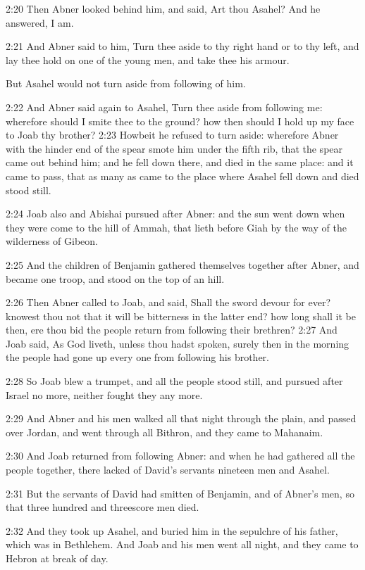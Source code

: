 2:20 Then Abner looked behind him, and said, Art thou Asahel? And he answered, I am.

2:21 And Abner said to him, Turn thee aside to thy right hand or to thy left, and lay thee hold on one of the young men, and take thee his armour.

But Asahel would not turn aside from following of him.

2:22 And Abner said again to Asahel, Turn thee aside from following me: wherefore should I smite thee to the ground? how then should I hold up my face to Joab thy brother?  2:23 Howbeit he refused to turn aside: wherefore Abner with the hinder end of the spear smote him under the fifth rib, that the spear came out behind him; and he fell down there, and died in the same place: and it came to pass, that as many as came to the place where Asahel fell down and died stood still.

2:24 Joab also and Abishai pursued after Abner: and the sun went down when they were come to the hill of Ammah, that lieth before Giah by the way of the wilderness of Gibeon.

2:25 And the children of Benjamin gathered themselves together after Abner, and became one troop, and stood on the top of an hill.

2:26 Then Abner called to Joab, and said, Shall the sword devour for ever?  knowest thou not that it will be bitterness in the latter end?  how long shall it be then, ere thou bid the people return from following their brethren?  2:27 And Joab said, As God liveth, unless thou hadst spoken, surely then in the morning the people had gone up every one from following his brother.

2:28 So Joab blew a trumpet, and all the people stood still, and pursued after Israel no more, neither fought they any more.

2:29 And Abner and his men walked all that night through the plain, and passed over Jordan, and went through all Bithron, and they came to Mahanaim.

2:30 And Joab returned from following Abner: and when he had gathered all the people together, there lacked of David's servants nineteen men and Asahel.

2:31 But the servants of David had smitten of Benjamin, and of Abner's men, so that three hundred and threescore men died.

2:32 And they took up Asahel, and buried him in the sepulchre of his father, which was in Bethlehem. And Joab and his men went all night, and they came to Hebron at break of day.

